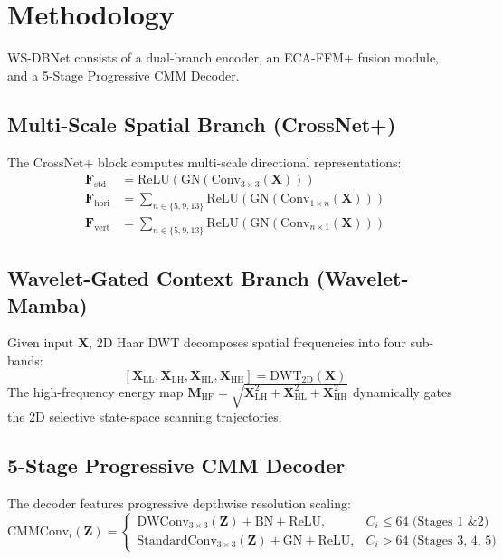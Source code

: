 \documentclass[journal]{IEEEtran}
\begin{document}
\section{Methodology}
WS-DBNet consists of a dual-branch encoder, an ECA-FFM+ fusion module, and a 5-Stage Progressive CMM Decoder.

\subsection{Multi-Scale Spatial Branch (CrossNet+)}
The CrossNet+ block computes multi-scale directional representations:
\begin{align}
\mathbf{F}_{\text{std}} &= \text{ReLU}\left( \text{GN}\left( \text{Conv}_{3\times 3}(\mathbf{X}) \right) \right) \\
\mathbf{F}_{\text{hori}} &= \sum_{n \in \{5, 9, 13\}} \text{ReLU}\left( \text{GN}\left( \text{Conv}_{1\times n}(\mathbf{X}) \right) \right) \\
\mathbf{F}_{\text{vert}} &= \sum_{n \in \{5, 9, 13\}} \text{ReLU}\left( \text{GN}\left( \text{Conv}_{n\times 1}(\mathbf{X}) \right) \right)
\end{align}

\subsection{Wavelet-Gated Context Branch (Wavelet-Mamba)}
Given input $\mathbf{X}$, 2D Haar DWT decomposes spatial frequencies into four sub-bands:
\begin{equation}
\left[ \mathbf{X}_{\text{LL}}, \mathbf{X}_{\text{LH}}, \mathbf{X}_{\text{HL}}, \mathbf{X}_{\text{HH}} \right] = \text{DWT}_{2\text{D}}(\mathbf{X})
\end{equation}
The high-frequency energy map $\mathbf{M}_{\text{HF}} = \sqrt{\mathbf{X}_{\text{LH}}^2 + \mathbf{X}_{\text{HL}}^2 + \mathbf{X}_{\text{HH}}^2}$ dynamically gates the 2D selective state-space scanning trajectories.

\subsection{5-Stage Progressive CMM Decoder}
The decoder features progressive depthwise resolution scaling:
\begin{equation}
\text{CMMConv}_i(\mathbf{Z}) = 
\begin{cases} 
\text{DWConv}_{3\times 3}(\mathbf{Z}) + \text{BN} + \text{ReLU}, & C_i \le 64 \text{ (Stages 1 \& 2)} \\
\text{StandardConv}_{3\times 3}(\mathbf{Z}) + \text{GN} + \text{ReLU}, & C_i > 64 \text{ (Stages 3, 4, 5)}
\end{cases}
\end{equation}
\end{document}
